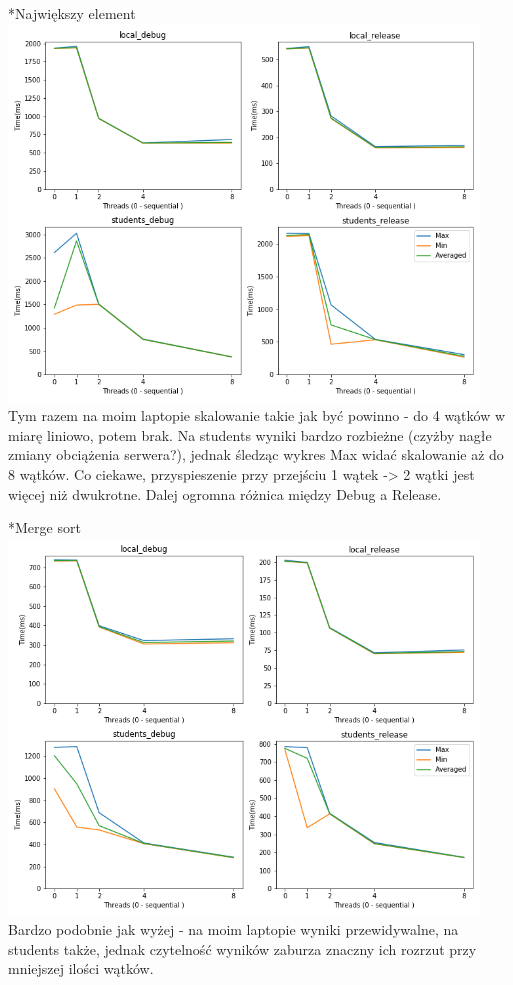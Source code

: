 \documentclass[a4paper,10pt,notitlepage]{report}
\begin{document}
\begin{section}*{Największy element}
\includegraphics[width=12.5cm, height=10cm]{max.png}\\
Tym razem na moim laptopie skalowanie takie jak być powinno - do 4 wątków w miarę liniowo, potem brak. Na students wyniki bardzo rozbieżne (czyżby nagłe zmiany obciążenia serwera?), jednak śledząc wykres Max widać skalowanie aż do 8 wątków. Co ciekawe, przyspieszenie przy przejściu 1 wątek -> 2 wątki jest więcej niż dwukrotne. Dalej ogromna różnica między Debug a Release.
\end{section}

\begin{section}*{Merge sort}
\includegraphics[width=12.5cm, height=10cm]{sort.png}\\
Bardzo podobnie jak wyżej - na moim laptopie wyniki przewidywalne, na students także, jednak czytelność wyników zaburza znaczny ich rozrzut przy mniejszej ilości wątków.
\end{section}
\end{document}
